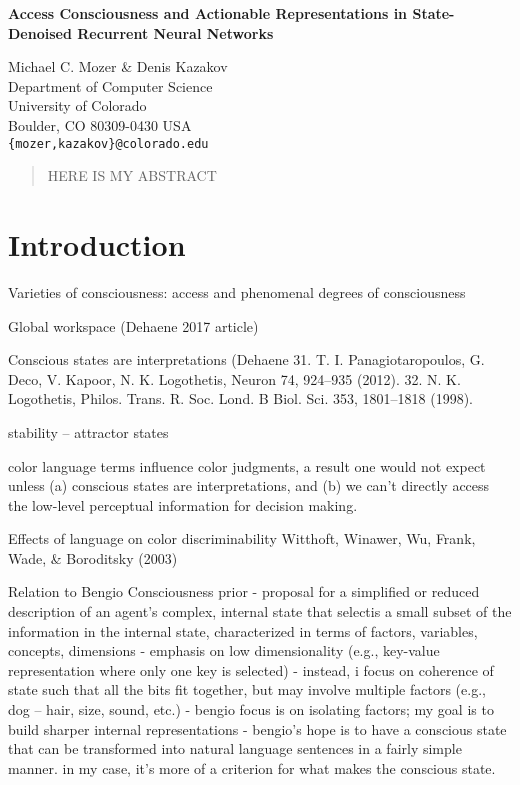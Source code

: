 \documentclass[11pt,letterpaper]{article}
\begin{document}
\begin{center}

{\Large \textbf{Access Consciousness and Actionable Representations in State-Denoised Recurrent Neural Networks}}

\vspace{1em}
Michael C. Mozer \& Denis Kazakov \\
Department of Computer Science \\
University of Colorado \\
Boulder, CO 80309-0430 USA \\
{\tt \{mozer,kazakov\}@colorado.edu}
\end{center}


\begin{abstract}
HERE IS MY ABSTRACT
\end{abstract}


\section{Introduction}

Varieties of consciousness:  access and phenomenal
degrees of consciousness

Global workspace (Dehaene 2017 article)

Conscious states are interpretations 
(Dehaene 
31. T. I. Panagiotaropoulos, G. Deco, V. Kapoor, N. K. Logothetis,
Neuron 74, 924–935 (2012).
32. N. K. Logothetis, Philos. Trans. R. Soc. Lond. B Biol. Sci. 353,
1801–1818 (1998).

stability -- attractor states

 color language terms influence color judgments, a result one would not expect unless (a) conscious states are interpretations, and (b) we can't directly access the low-level perceptual information for decision making.

Effects of language on color discriminability
Witthoft, Winawer, Wu, Frank, Wade, \& Boroditsky (2003)

Relation to Bengio Consciousness prior
- proposal for a simplified or reduced description of an agent's complex, 
internal state that selectis a small subset of the information in the internal 
state, characterized in terms of factors, variables, concepts, dimensions
- emphasis on low dimensionality (e.g., key-value representation where only
one key is selected)
- instead, i focus on coherence of state such that all the bits fit together,
  but may involve multiple factors (e.g., dog -- hair, size, sound, etc.)
- bengio focus is on isolating factors; my goal is to build sharper internal
representations
- bengio's hope is to have a conscious state that can be transformed into
natural language sentences in a fairly simple manner.  in my case, it's more
of a criterion for what makes the conscious state.
\end{document}
